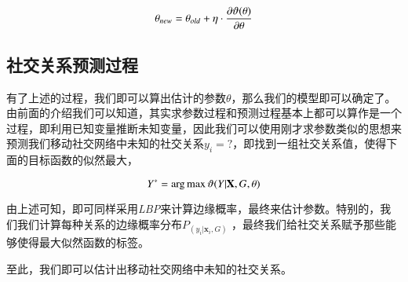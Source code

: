 \begin{equation}
\label{eq-learning}
\theta_{new} = \theta_{old} + \eta \cdot \frac{\partial \vartheta(\theta)}{\partial \theta} \\
\end{equation}


\subsection{社交关系预测过程}

有了上述的过程，我们即可以算出估计的参数$\theta$，那么我们的模型即可以确定了。由前面的介绍我们可以知道，其实求参数过程和预测过程基本上都可以算作是一个过程，即利用已知变量推断未知变量，因此我们可以使用刚才求参数类似的思想来预测我们移动社交网络中未知的社交关系${y_i = ?}$，即找到一组社交关系值，使得下面的目标函数的似然最大，

\begin{equation}
Y^{\ast} = \arg \max \vartheta(Y|\textbf{X},G,\theta) \\
\end{equation}

由上述可知，即可同样采用\textit{LBP}来计算边缘概率，最终来估计参数。特别的，我们我们计算每种关系的边缘概率分布$P_(y_i | \textbf{x}_i, G)$ ，最终我们给社交关系赋予那些能够使得最大似然函数的标签。

至此，我们即可以估计出移动社交网络中未知的社交关系。








































